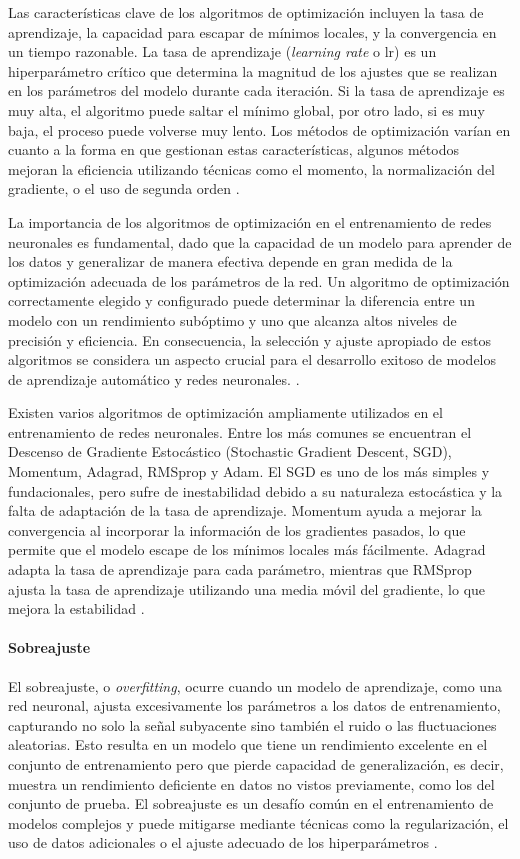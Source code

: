 Las características clave de los algoritmos de optimización incluyen la tasa de aprendizaje, la capacidad para escapar de mínimos locales, y la convergencia en un tiempo razonable. La tasa de aprendizaje (\textit{learning rate} o lr) es un hiperparámetro crítico que determina la magnitud de los ajustes que se realizan en los parámetros del modelo durante cada iteración. Si la tasa de aprendizaje es muy alta, el algoritmo puede saltar el mínimo global, por otro lado, si es muy baja, el proceso puede volverse muy lento. Los métodos de optimización varían en cuanto a la forma en que gestionan estas características, algunos métodos mejoran la eficiencia utilizando técnicas como el momento, la normalización del gradiente, o el uso de segunda orden \cite{kingma2014adam}.


La importancia de los algoritmos de optimización en el entrenamiento de redes neuronales es fundamental, dado que la capacidad de un modelo para aprender de los datos y generalizar de manera efectiva depende en gran medida de la optimización adecuada de los parámetros de la red. Un algoritmo de optimización correctamente elegido y configurado puede determinar la diferencia entre un modelo con un rendimiento subóptimo y uno que alcanza altos niveles de precisión y eficiencia. En consecuencia, la selección y ajuste apropiado de estos algoritmos se considera un aspecto crucial para el desarrollo exitoso de modelos de aprendizaje automático y redes neuronales. \cite{goodfellow2016deep}.

Existen varios algoritmos de optimización ampliamente utilizados en el entrenamiento de redes neuronales. Entre los más comunes se encuentran el Descenso de Gradiente Estocástico (Stochastic Gradient Descent, SGD), Momentum, Adagrad, RMSprop y Adam. El SGD es uno de los más simples y fundacionales, pero sufre de inestabilidad debido a su naturaleza estocástica y la falta de adaptación de la tasa de aprendizaje. Momentum ayuda a mejorar la convergencia al incorporar la información de los gradientes pasados, lo que permite que el modelo escape de los mínimos locales más fácilmente. Adagrad adapta la tasa de aprendizaje para cada parámetro, mientras que RMSprop ajusta la tasa de aprendizaje utilizando una media móvil del gradiente, lo que mejora la estabilidad \cite{bottou2010large}.

\paragraph{Sobreajuste}
El sobreajuste, o \textit{overfitting}, ocurre cuando un modelo de aprendizaje, como una red neuronal, ajusta excesivamente los parámetros a los datos de entrenamiento, capturando no solo la señal subyacente sino también el ruido o las fluctuaciones aleatorias. Esto resulta en un modelo que tiene un rendimiento excelente en el conjunto de entrenamiento pero que pierde capacidad de generalización, es decir, muestra un rendimiento deficiente en datos no vistos previamente, como los del conjunto de prueba. El sobreajuste es un desafío común en el entrenamiento de modelos complejos y puede mitigarse mediante técnicas como la regularización, el uso de datos adicionales o el ajuste adecuado de los hiperparámetros \cite{bishop2006pattern}.

